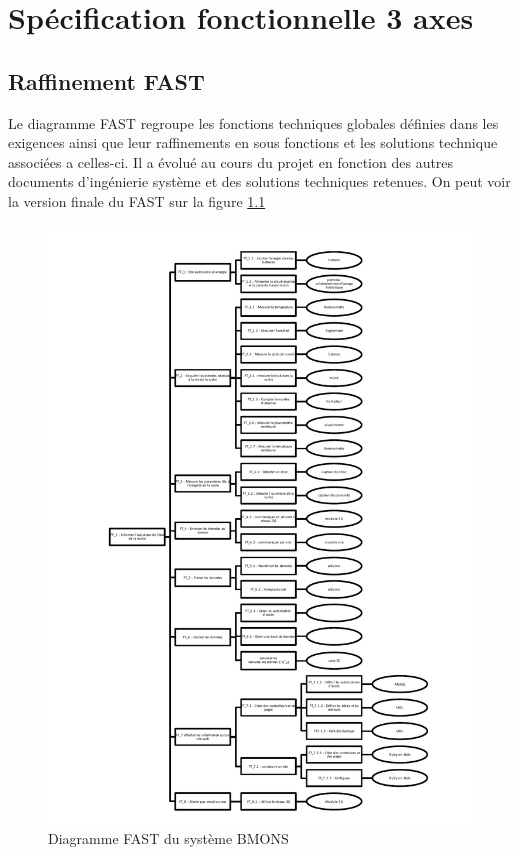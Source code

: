 \chapter{Spécification fonctionnelle  3 axes}

\section{Raffinement FAST}
Le diagramme FAST regroupe les fonctions techniques globales définies dans les 
exigences ainsi que leur raffinements en sous fonctions et les solutions technique 
associées a celles-ci. Il a évolué au cours du projet en fonction des autres documents 
d'ingénierie système et des solutions techniques retenues. On peut voir la version finale du FAST sur la figure \ref{fig:fast}

\clearpage

\begin{figure}[h!]
\centering\includegraphics[scale=0.7]{FAST_BMONS.pdf}
\caption{\label{fig:fast} Diagramme FAST du système BMONS}
\end{figure}


